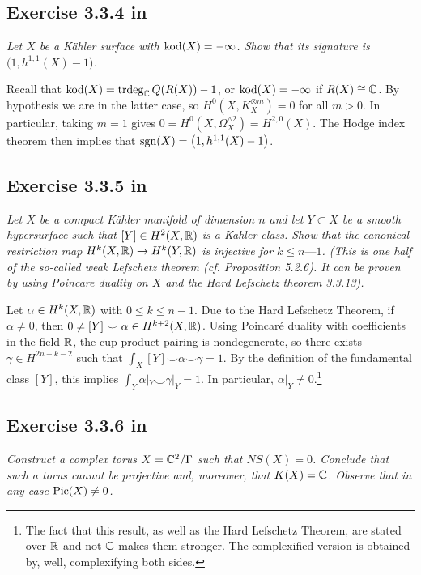 \documentclass{article}
\begin{document}
\subsection*{Exercise 3.3.4 in \cite{Huy}}
\emph{Let $X$ be a K\"{a}hler surface with $\operatorname{kod}(X) = -\infty$. Show that its signature is $\big(1,h^{1,1}(X)-1\big)$.}
\vspace{3mm}

Recall that $\operatorname{kod}(X)= \operatorname{trdeg}_{\mathbb{C}} Q(R(X)) - 1$, or $\operatorname{kod}(X) = -\infty$ if $R(X) \cong \mathbb{C}$. By hypothesis we are in the
latter case, so $H^0(X,K_X^{\otimes m}) = 0$ for all $m>0$. In particular, taking $m=1$ gives
$0 = H^0(X,\Omega_X^{\wedge 2}) = H^{2,0}(X)$. The Hodge index theorem then implies that $\operatorname{sgn}(X) = \big(1,h^{1,1}(X)-1\big)$.


\subsection*{Exercise 3.3.5 in \cite{Huy}}
\emph{Let $X$ be a compact K\"{a}hler manifold of dimension $n$ and let $Y \subset X$ be
a smooth hypersurface such that $[Y] \in H^2(X, \mathbb{R})$ is a Kahler class. Show that the
canonical restriction map $H^k(X, \mathbb{R}) \to H^k(Y, \mathbb{R})$ is injective for $k \leq n — 1$. (This is
one half of the so-called weak Lefschetz theorem (cf. Proposition 5.2.6). It can be
proven by using Poincare duality on $X$ and the Hard Lefschetz theorem 3.3.13).}
\vspace{3mm}

Let $\alpha \in H^k(X,\mathbb{R})$ with $0\leq k \leq n-1$. Due to the Hard Lefschetz Theorem, if $\alpha \neq 0$, then
$0 \neq [Y] \smile \alpha  \in H^{k+2}(X,\mathbb{R})$. Using Poincar\'{e} duality with coefficients in the field $\mathbb{R}$, 
the cup product pairing is nondegenerate, so there exists $\gamma \in H^{2n-k-2}$ such that
$\int_X [Y] \smile \alpha \smile \gamma = 1$. By the definition of the fundamental class $[Y]$, this implies
$\int_Y \alpha|_Y \smile \gamma|_Y = 1$. In particular, $\alpha|_Y \neq 0$.\footnote{The fact that this result,
as well as the Hard Lefschetz Theorem, are stated over $\mathbb{R}$ and not $\mathbb{C}$ makes them stronger. The complexified
version is obtained by, well, complexifying both sides.}




\subsection*{Exercise 3.3.6 in \cite{Huy}}
\emph{Construct a complex torus $X = \mathbb{C}^2/\Gamma$ such that $NS(X) = 0$. Conclude that
such a torus cannot be projective and, moreover, that $K(X) = \mathbb{C}$. Observe that in
any case $\operatorname{Pic}(X) \neq 0$.}
\vspace{3mm}
\end{document}

